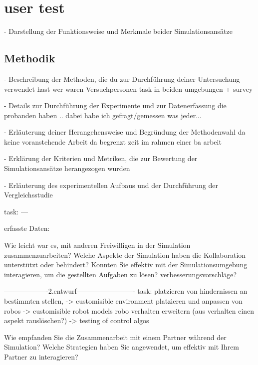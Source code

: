 \documentclass[german,version-2020-11]{uzl-thesis}
\begin{document}
\chapter{user test} 
- Darstellung der Funktionsweise und Merkmale beider Simulationsansätze
\section{Methodik}

  
      


- Beschreibung der Methoden, die du zur Durchführung deiner Untersuchung verwendet hast 
wer waren Versuchpersonen        
task in beiden umgebungen + survey
      
- Details zur Durchführung der Experimente und zur Datenerfassung
die probanden haben .. dabei habe ich gefragt/gemessen was jeder... 
      
- Erläuterung deiner Herangehensweise und Begründung der Methodenwahl 
da keine voranstehende Arbeit
da begrenzt zeit im rahmen einer ba arbeit
      
- Erklärung der Kriterien und Metriken, die zur Bewertung der Simulationsansätze herangezogen wurden

- Erläuterung des experimentellen Aufbaus und der Durchführung der Vergleichsstudie
      



      task: ---
      
      erfasste Daten:


        Wie leicht war es, mit anderen Freiwilligen in der Simulation zusammenzuarbeiten?
        Welche Aspekte der Simulation haben die Kollaboration unterstützt oder behindert?
        Konnten Sie effektiv mit der Simulationsumgebung interagieren, um die gestellten Aufgaben zu lösen?
        verbesserungsvorschläge?

        -------------------2.entwurf-------------------------
        task: 
        platzieren von hindernissen an bestimmten stellen, -> customisible environment
        platzieren und anpassen von robos -> customisible robot models
        robo verhalten erweitern (aus verhalten einen aspekt rauslöschen?) -> testing of control algos
        
        Wie empfanden Sie die Zusammenarbeit mit einem Partner während der Simulation?
        Welche Strategien haben Sie angewendet, um effektiv mit Ihrem Partner zu interagieren?
        
\end{document}

